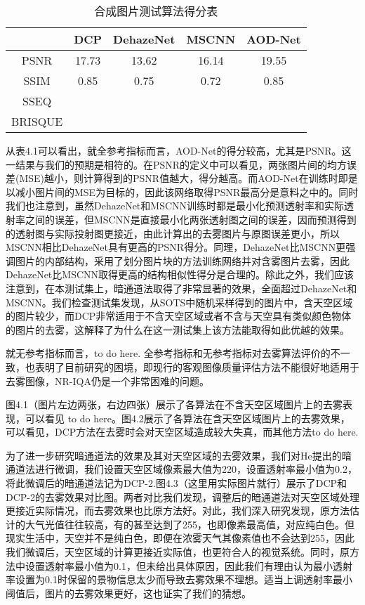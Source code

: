 \documentclass[a4paper, 12pt]{report}
\begin{document}
\begin{table}[htbp]
  \centering
  \caption{合成图片测试算法得分表}
    \begin{tabular}{c|c|c|c|c}
    \hline
         & DCP    & DehazeNet  & MSCNN    & AOD-Net  \\
    \hline
    	PSNR	 & 17.73    & 13.62 & 16.14    & 19.55 \\
	\hline
     SSIM     & 0.85 & 0.75 & 0.72     & 0.85   \\
	\hline
    SSEQ &   &  &     &  \\
    \hline
     BRISQUE     &       &       &   & \\
     \hline
  
    \end{tabular}%
  \label{tab:4.1}%
\end{table}%
从表4.1可以看出，就全参考指标而言，AOD-Net的得分较高，尤其是PSNR。这一结果与我们的预期是相符的。在PSNR的定义中可以看见，两张图片间的均方误差(MSE)越小，则计算得到的PSNR值越大，得分越高。而AOD-Net在训练时即是以减小图片间的MSE为目标的，因此该网络取得PSNR最高分是意料之中的。同时我们也注意到，虽然DehazeNet和MSCNN训练时都是最小化预测透射率和实际透射率之间的误差，但MSCNN是直接最小化两张透射图之间的误差，因而预测得到的透射图与实际投射图更接近，由此计算出的去雾图片与原图误差更小，所以MSCNN相比DehazeNet具有更高的PSNR得分。同理，DehazeNet比MSCNN更强调图片的内部结构，采用了划分图片块的方法训练网络并对含雾图片去雾，因此DehazeNet比MSCNN取得更高的结构相似性得分是合理的。除此之外，我们应该注意到，在本测试集上，暗通道法取得了非常显著的效果，全面超过DehazeNet和MSCNN。我们检查测试集发现，从SOTS中随机采样得到的图片中，含天空区域的图片较少，而DCP非常适用于不含天空区域或者不含与天空具有类似颜色物体的图片的去雾，这解释了为什么在这一测试集上该方法能取得如此优越的效果。

就无参考指标而言，to do here. 全参考指标和无参考指标对去雾算法评价的不一致，也表明了目前研究的困境，即现行的客观图像质量评估方法不能很好地适用于去雾图像，NR-IQA仍是一个非常困难的问题。

图4.1（图片左边两张，右边四张）展示了各算法在不含天空区域图片上的去雾表现，可以看见 to do here。图4.2展示了各算法在含天空区域图片上的去雾效果，可以看见，DCP方法在去雾时会对天空区域造成较大失真，而其他方法to do here.

为了进一步研究暗通道法的效果及其对天空区域的去雾效果，我们对He提出的暗通道法进行微调，我们设置天空区域像素最大值为220，设置透射率最小值为0.2，将此微调后的暗通道法记为DCP-2.图4.3（这里用实际图片就行）展示了DCP和DCP-2的去雾效果对比图。两者对比我们发现，调整后的暗通道法对天空区域处理更接近实际情况，而去雾效果也比原方法好。对此，我们深入研究发现，原方法估计的大气光值往往较高，有的甚至达到了255，也即像素最高值，对应纯白色。但现实生活中，天空并不是纯白色，即便在浓雾天气其像素值也不会达到255，因此我们微调后，天空区域的计算更接近实际值，也更符合人的视觉系统。同时，原方法中设置透射率最小值为0.1，但未给出具体原因，因此我们有理由认为最小透射率设置为0.1时保留的景物信息太少而导致去雾效果不理想。适当上调透射率最小阈值后，图片的去雾效果更好，这也证实了我们的猜想。
\end{document}
